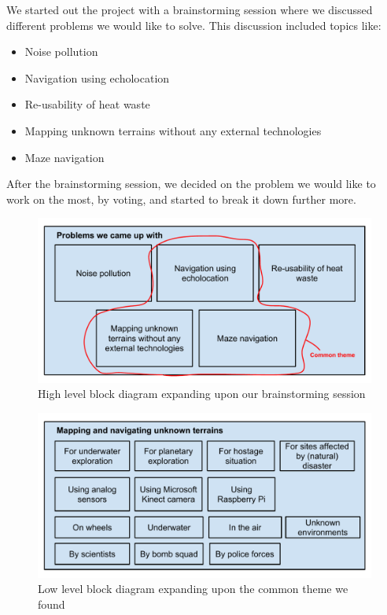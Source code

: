 We started out the project with a brainstorming session where we discussed different problems we would like to solve. This discussion included topics like:
\begin{itemize}
	\item Noise pollution
	\item Navigation using echolocation
	\item Re-usability of heat waste
	\item Mapping unknown terrains without any external technologies
	\item Maze navigation
\end{itemize}

After the brainstorming session, we decided on the problem we would like to work on the most, by voting, and started to break it down further more.

\begin{figure}[!h]
	\centering
	\includegraphics[scale=.7]{images/high-level-block.pdf}
	\caption{High level block diagram expanding upon our brainstorming session}
	\label{fig:highlevelblock}
\end{figure}

\begin{figure}[!h]
	\centering
	\includegraphics[scale=.7]{images/low-level-block.pdf}
	\caption{Low level block diagram expanding upon the common theme we found}
	\label{fig:lowlevelblock}
\end{figure}